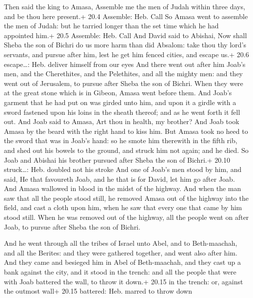  Then said the king to Amasa, Assemble me the men of Judah
within three days, and be thou here present.+ 20.4 Assemble: Heb. Call
 So Amasa went to assemble the men of Judah: but he tarried
longer than the set time which he had appointed him.+ 20.5 Assemble:
Heb. Call  And David said to Abishai, Now shall Sheba the
son of Bichri do us more harm than did Absalom: take thou thy lord's
servants, and pursue after him, lest he get him fenced cities, and
escape us.+ 20.6 escape\ldots: Heb. deliver himself from our eyes
 And there went out after him Joab's men, and the
Cherethites, and the Pelethites, and all the mighty men: and they went
out of Jerusalem, to pursue after Sheba the son of Bichri. 
When they were at the great stone which is in Gibeon, Amasa went before
them. And Joab's garment that he had put on was girded unto him, and
upon it a girdle with a sword fastened upon his loins in the sheath
thereof; and as he went forth it fell out.  And Joab said to
Amasa, Art thou in health, my brother? And Joab took Amasa by the beard
with the right hand to kiss him.  But Amasa took no heed to
the sword that was in Joab's hand: so he smote him therewith in the
fifth rib, and shed out his bowels to the ground, and struck him not
again; and he died. So Joab and Abishai his brother pursued after Sheba
the son of Bichri.+ 20.10 struck\ldots: Heb. doubled not his stroke
 And one of Joab's men stood by him, and said, He that
favoureth Joab, and he that is for David, let him go after Joab.
 And Amasa wallowed in blood in the midst of the highway.
And when the man saw that all the people stood still, he removed Amasa
out of the highway into the field, and cast a cloth upon him, when he
saw that every one that came by him stood still.  When he
was removed out of the highway, all the people went on after Joab, to
pursue after Sheba the son of Bichri.

 And he went through all the tribes of Israel unto Abel,
and to Beth-maachah, and all the Berites: and they were gathered
together, and went also after him.  And they came and
besieged him in Abel of Beth-maachah, and they cast up a bank against
the city, and it stood in the trench: and all the people that were with
Joab battered the wall, to throw it down.+ 20.15 in the trench: or,
against the outmost wall+ 20.15 battered: Heb. marred to throw down

